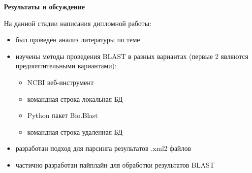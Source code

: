 \newpage
\begin{center}
  \textbf{\large Результаты и обсуждение}
\end{center}


На данной стадии написания дипломной работы:
\begin{itemize}
    \item был проведен анализ литературы по теме
    \item изучены методы проведения BLAST в разных вариантах (первые 2 являются предпочтительными вариантами):
    \begin{itemize}
        \item NCBI веб-инструмент
        \item командная строка локальная БД
        \item Python пакет Bio.Blast
        \item командная строка удаленная БД
    \end{itemize}
    \item разработан подход для парсинга результатов .xml2 файлов
    \item частично разработан пайплайн для обработки результатов BLAST
\end{itemize}
